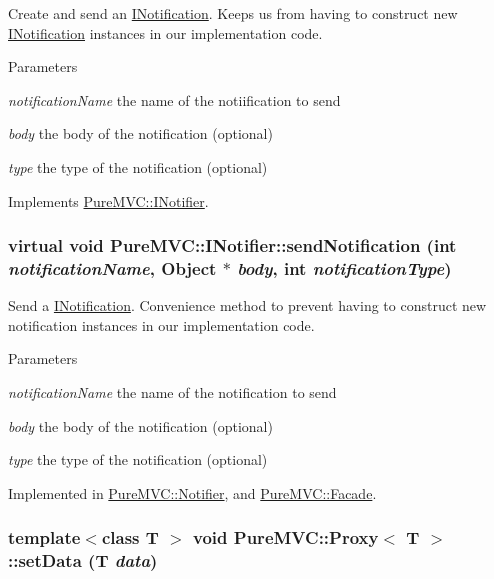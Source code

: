 Create and send an {\ttfamily \hyperlink{class_pure_m_v_c_1_1_i_notification}{INotification}}. Keeps us from having to construct new \hyperlink{class_pure_m_v_c_1_1_i_notification}{INotification} instances in our implementation code. 
\begin{DoxyParams}{Parameters}
\item[{\em notificationName}]the name of the notiification to send \item[{\em body}]the body of the notification (optional) \item[{\em type}]the type of the notification (optional) \end{DoxyParams}


Implements \hyperlink{class_pure_m_v_c_1_1_i_notifier_a65e8333ccfea74138b79f84dac96af25}{PureMVC::INotifier}.\hypertarget{class_pure_m_v_c_1_1_i_notifier_a65e8333ccfea74138b79f84dac96af25}{
\subsubsection[{sendNotification}]{\setlength{\rightskip}{0pt plus 5cm}virtual void PureMVC::INotifier::sendNotification (int {\em notificationName}, \/  {\bf Object} $\ast$ {\em body}, \/  int {\em notificationType})}}
\label{class_pure_m_v_c_1_1_i_notifier_a65e8333ccfea74138b79f84dac96af25}


Send a {\ttfamily \hyperlink{class_pure_m_v_c_1_1_i_notification}{INotification}}. Convenience method to prevent having to construct new notification instances in our implementation code.


\begin{DoxyParams}{Parameters}
\item[{\em notificationName}]the name of the notification to send \item[{\em body}]the body of the notification (optional) \item[{\em type}]the type of the notification (optional) \end{DoxyParams}


Implemented in \hyperlink{class_pure_m_v_c_1_1_notifier_a55a358ee2661ecc08400653016fdb497}{PureMVC::Notifier}, and \hyperlink{class_pure_m_v_c_1_1_facade_a39a61e0a65d0f979848d36fe99cfd5f5}{PureMVC::Facade}.\hypertarget{class_pure_m_v_c_1_1_proxy_ae14f7e555987a8e25584067a0e96c32a}{
\subsubsection[{setData}]{\setlength{\rightskip}{0pt plus 5cm}template$<$class T $>$ void {\bf PureMVC::Proxy}$<$ T $>$::setData (T {\em data})}}
\label{class_pure_m_v_c_1_1_proxy_ae14f7e555987a8e25584067a0e96c32a}


